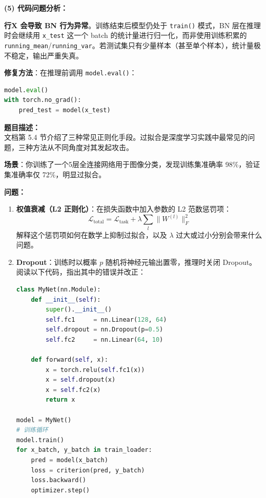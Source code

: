 \documentclass[a4paper,11pt]{ctexart}
\begin{document}
\begin{solutionbox}[参考答案与详细解析]
    \textbf{(5) 代码问题分析：}

    \textbf{行X 会导致 BN 行为异常}。训练结束后模型仍处于 \texttt{train()} 模式，BN 层在推理时会继续用 \texttt{x\_test} 这一个 batch 的统计量进行归一化，而非使用训练积累的 \texttt{running\_mean}/\texttt{running\_var}。若测试集只有少量样本（甚至单个样本），统计量极不稳定，输出严重失真。

    \textbf{修复方法}：在推理前调用 \texttt{model.eval()}：
    \begin{lstlisting}[language=Python]
model.eval()
with torch.no_grad():
    pred_test = model(x_test)
    \end{lstlisting}
\end{solutionbox}


\begin{problembox}
    \textbf{题目描述：}\\
    文档第 5.4 节介绍了三种常见正则化手段。过拟合是深度学习实践中最常见的问题，三种方法从不同角度对其发起攻击。

    \vspace{0.3cm}
    \textbf{场景}：你训练了一个5层全连接网络用于图像分类，发现训练集准确率 98\%，验证集准确率仅 72\%，明显过拟合。

    \vspace{0.3cm}
    \textbf{问题：}
    \begin{enumerate}[(1)]
        \item \textbf{权值衰减（L2 正则化）}：在损失函数中加入参数的 L2 范数惩罚项：
        \[
        \mathcal{L}_{\text{total}} = \mathcal{L}_{\text{task}} + \lambda \sum_{l}\|W^{(l)}\|_F^2
        \]
        解释这个惩罚项如何在数学上抑制过拟合，以及 $\lambda$ 过大或过小分别会带来什么问题。

        \item \textbf{Dropout}：训练时以概率 $p$ 随机将神经元输出置零，推理时关闭 Dropout。阅读以下代码，指出其中的错误并改正：
        \begin{lstlisting}[language=Python]
class MyNet(nn.Module):
    def __init__(self):
        super().__init__()
        self.fc1     = nn.Linear(128, 64)
        self.dropout = nn.Dropout(p=0.5)
        self.fc2     = nn.Linear(64, 10)

    def forward(self, x):
        x = torch.relu(self.fc1(x))
        x = self.dropout(x)
        x = self.fc2(x)
        return x

model = MyNet()
# 训练循环
model.train()
for x_batch, y_batch in train_loader:
    pred = model(x_batch)
    loss = criterion(pred, y_batch)
    loss.backward()
    optimizer.step()


\end{lstlisting}
\end{enumerate}
\end{problembox}
\end{document}
